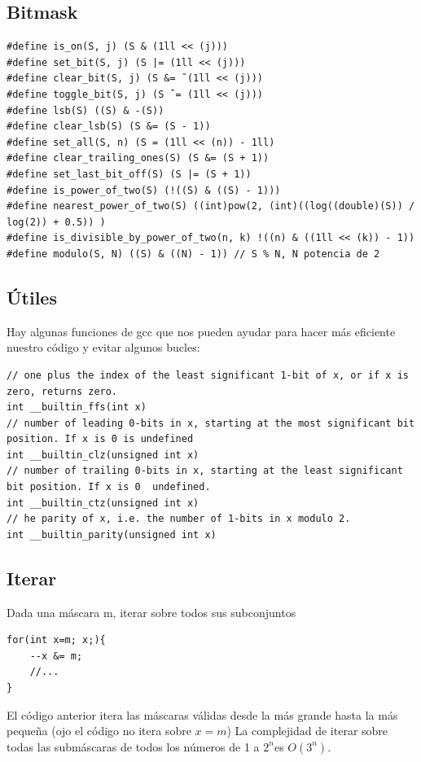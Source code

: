 \documentclass[12 pts,spanish,mexico]{article}
\numberwithin{equation}{section}
\begin{document}
\begin{multicols}{2}
\section{Bitmask}

\begin{verbatim}
#define is_on(S, j) (S & (1ll << (j)))
#define set_bit(S, j) (S |= (1ll << (j)))
#define clear_bit(S, j) (S &= ˜(1ll << (j)))
#define toggle_bit(S, j) (S ˆ= (1ll << (j)))
#define lsb(S) ((S) & -(S))
#define clear_lsb(S) (S &= (S - 1))
#define set_all(S, n) (S = (1ll << (n)) - 1ll)
#define clear_trailing_ones(S) (S &= (S + 1))
#define set_last_bit_off(S) (S |= (S + 1))
#define is_power_of_two(S) (!((S) & ((S) - 1)))
#define nearest_power_of_two(S) ((int)pow(2, (int)((log((double)(S)) / log(2)) + 0.5)) )
#define is_divisible_by_power_of_two(n, k) !((n) & ((1ll << (k)) - 1))
#define modulo(S, N) ((S) & ((N) - 1)) // S % N, N potencia de 2
\end{verbatim}

\subsection{Útiles}
Hay algunas funciones de gcc que nos pueden ayudar para hacer más eficiente nuestro código y evitar algunos bucles:
\begin{verbatim}
// one plus the index of the least significant 1-bit of x, or if x is zero, returns zero.
int __builtin_ffs(int x)
// number of leading 0-bits in x, starting at the most significant bit position. If x is 0 is undefined
int __builtin_clz(unsigned int x)
// number of trailing 0-bits in x, starting at the least significant bit position. If x is 0  undefined.
int __builtin_ctz(unsigned int x)
// he parity of x, i.e. the number of 1-bits in x modulo 2.
int __builtin_parity(unsigned int x)
\end{verbatim}
\subsection{Iterar}
Dada una máscara m, iterar sobre todos sus subconjuntos
\begin{verbatim}
for(int x=m; x;){
    --x &= m;
    //...
}
\end{verbatim}
El código anterior itera las máscaras válidas desde la más grande hasta la más pequeña (ojo el código no itera sobre $x=m$)
La complejidad de iterar sobre todas las submáscaras de todos los números de 1 a $2^n $es $O(3^n)$.




\end{multicols}
\end{document}
